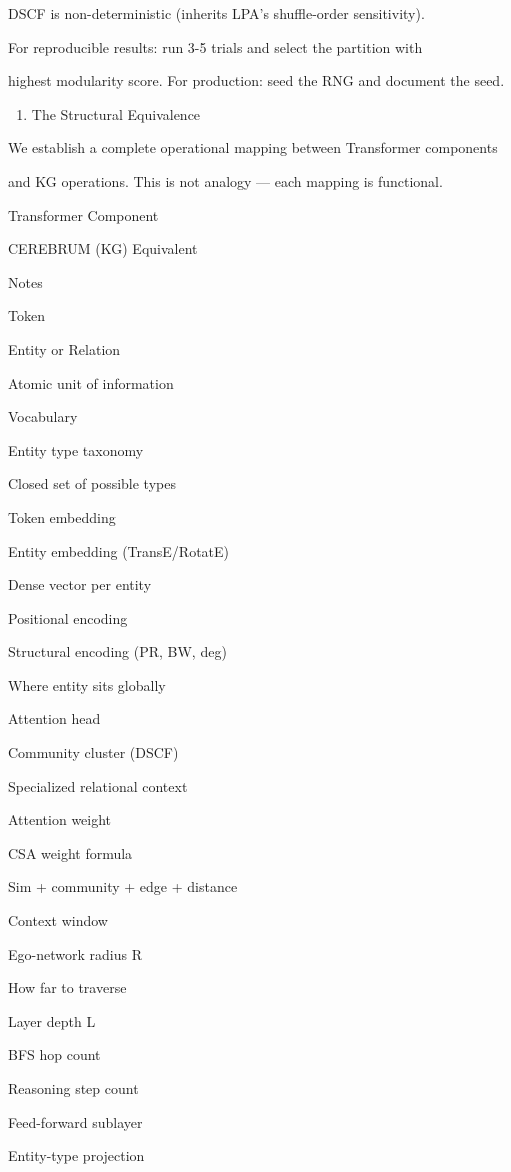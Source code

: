 \documentclass[10pt,journal,compsoc]{IEEEtran}
\begin{document}
DSCF is non-deter\-ministic (inherits LPA's shuffle-order sensitivity).

For repro\-ducible results: run 3-5 trials and select the partition with

highest modularity score. For production: seed the RNG and document the seed.

\begin{enumerate}
\item The Structural Equivalence

\end{enumerate}
We establish a complete operational mapping between Transformer components

and KG operations. This is not analogy — each mapping is functional.

Transformer Component

CEREBRUM (KG) Equivalent

Notes

Token

Entity or Relation

Atomic unit of information

Vocabulary

Entity type taxonomy

Closed set of possible types

Token embedding

Entity embedding (TransE/RotatE)

Dense vector per entity

Positional encoding

Structural encoding (PR, BW, deg)

Where entity sits globally

Attention head

Community cluster (DSCF)

Specialized relational context

Attention weight

CSA weight formula

Sim + community + edge + distance

Context window

Ego-network radius R

How far to traverse

Layer depth L

BFS hop count

Reasoning step count

Feed-forward sublayer

Entity-type projection
\end{document}
